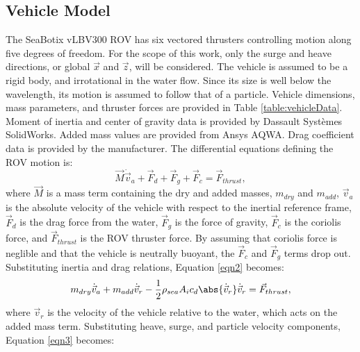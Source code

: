 \documentclass[letterpaper, 10 pt, conferences]{ieeeconf}  %
\begin{document}
\subsection{Vehicle Model}

The SeaBotix vLBV300 ROV has six vectored thrusters controlling motion along five degrees of freedom. For the scope of this work, only the surge and heave directions, or global $\vec{x}$ and $\vec{z}$, will be considered. The vehicle is assumed to be a rigid body, and irrotational in the water flow. Since its size is well below the wavelength, its motion is assumed to follow that of a particle. Vehicle dimensions, mass parameters, and thruster forces are provided in Table \ref{table:vehicleData}. Moment of inertia and center of gravity data is provided by Dassault Systèmes SolidWorks. Added mass values are provided from Ansys AQWA. Drag coefficient data is provided by the manufacturer. The differential equations defining the ROV motion is: 
\begin{equation}
\vec{M}\dot{\vec{v}}_a + \vec{F}_d + \vec{F}_g + \vec{F}_c = \vec{F}_{thrust},
\label{eqn2}
\end{equation}
where $\vec{M}$ is a mass term containing the dry and added masses, $m_{dry}$ and $m_{add}$, $\vec{v}_a$ is the absolute velocity of the vehicle with respect to the inertial reference frame, $\vec{F}_d$ is the drag force from the water, $\vec{F}_g$ is the force of gravity, $\vec{F}_c$ is the coriolis force, and $\vec{F}_{thrust}$ is the ROV thruster force. By assuming that coriolis force is neglible and that the vehicle is neutrally buoyant, the $\vec{F}_c$ and $\vec{F}_g$ terms drop out. Substituting inertia and drag relations, Equation \ref{eqn2} becomes: 
\begin{equation}
m_{dry} \dot{\vec{v}}_a + m_{add} \dot{\vec{v}}_r  - \frac{1}{2} \rho_{sea} A_i c_d \abs{\dot{\vec{v}}_r} \dot{\vec{v}}_r = \vec{F}_{thrust},
\label{eqn3}
\end{equation}
where $\vec{v}_r$ is the velocity of the vehicle relative to the water, which acts on the added mass term. Substituting heave, surge, and particle velocity components, Equation \ref{eqn3} becomes:
\end{document}
